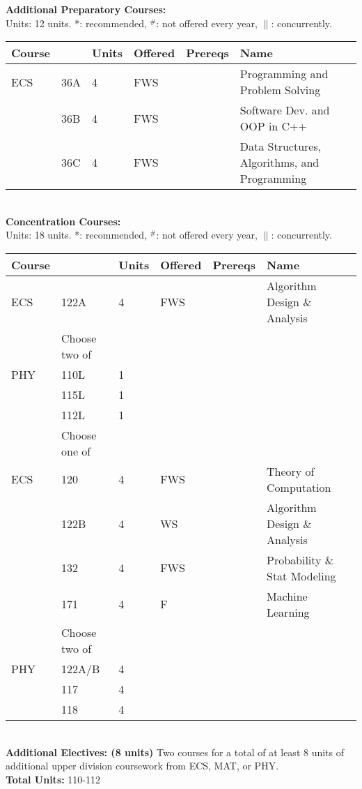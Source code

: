 \documentclass[12pt]{article}
\begin{document}
\newpage
{}
\vskip 0.25cm
\noindent
{\bf Additional Preparatory Courses:  }\\
Units:  12 units. *: recommended, $^\#$: not offered every year, $\parallel$: concurrently.\\
\begin{tabular}{|llllll|}
\hline
Course & & Units & Offered & Prereqs & Name \\
\hline
ECS & 36A  & 4 & FWS & & Programming and Problem Solving\\
    & 36B  & 4 & FWS & & Software Dev. and OOP in C++\\
    & 36C  & 4 & FWS & & Data Structures, Algorithms, and Programming\\
\hline
\end{tabular}\\
\vskip 0.25cm
\noindent
{\bf Concentration Courses:  }\\
Units:  18 units. *: recommended, $^\#$: not offered every year, $\parallel$: concurrently.\\
\begin{tabular}{|llllll|}
\hline
Course & & Units & Offered & Prereqs & Name \\
\hline
ECS & 122A & 4 & FWS & & Algorithm Design \& Analysis\\
\hline
\hline
    & Choose two of & & & & \\
\hline
PHY    & 110L & 1 & & & \\
    & 115L & 1 & & & \\
    & 112L & 1 & & & \\
\hline
\hline
    & Choose one of & & & & \\
\hline
ECS & 120  & 4 & FWS & & Theory of Computation \\
    & 122B & 4 & WS  & & Algorithm Design \& Analysis \\
    & 132  & 4 & FWS & & Probability \& Stat Modeling \\
    & 171  & 4 & F   & & Machine Learning \\
\hline
\hline
    & Choose two of & & & & \\
\hline
PHY & 122A/B & 4 & & & \\
    & 117   & 4 & & & \\
    & 118   & 4 & & & \\
\hline
\end{tabular}\\
\vskip 0.25cm
\noindent
{\bf Additional Electives: (8 units)} Two courses for a total of at least 8 units of additional upper division coursework from ECS, MAT, or PHY.\\
{\bf Total Units:} 110-112\\
\end{document}
